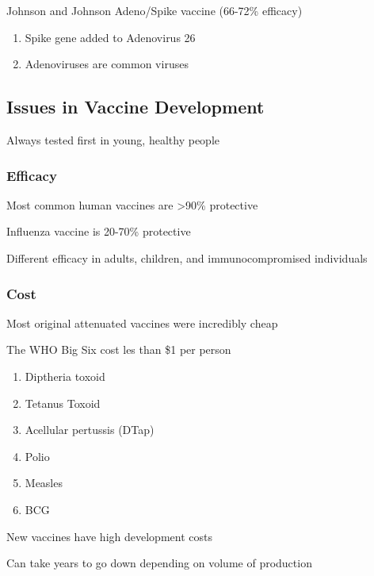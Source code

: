 \documentclass{notes}
\begin{document}
Johnson and Johnson Adeno/Spike vaccine (66-72\% efficacy)
\begin{enumerate}
    \item Spike gene added to Adenovirus 26
    \item Adenoviruses are common viruses
\end{enumerate}

\subsection*{Issues in Vaccine Development}
Always tested first in young, healthy people

\subsubsection*{Efficacy}
Most common human vaccines are \textgreater 90\% protective

Influenza vaccine is 20-70\% protective

Different efficacy in adults, children, and immunocompromised individuals

\subsubsection*{Cost}
Most original attenuated vaccines were incredibly cheap

The WHO Big Six cost les than \$1 per person
\begin{enumerate}
    \item Diptheria toxoid
    \item Tetanus Toxoid
    \item Acellular pertussis (DTap)
    \item Polio
    \item Measles
    \item BCG
\end{enumerate}

New vaccines have high development costs

\tab \indicates Can take years to go down depending on volume of production
\end{document}
